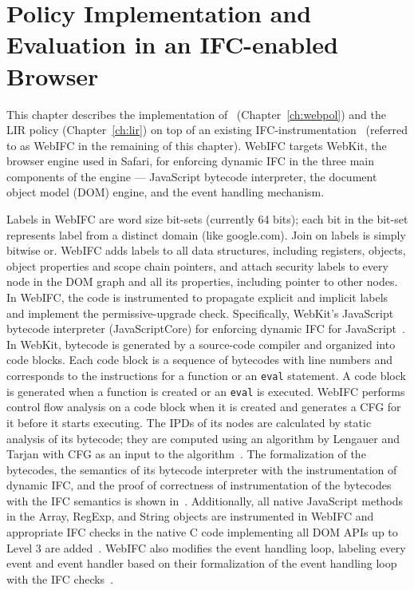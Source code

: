 \chapter{Policy Implementation and Evaluation in an IFC-enabled Browser}
\label{ch:eval}

This chapter describes the implementation of \sys~(Chapter~\ref{ch:webpol}) 
and the LIR policy (Chapter~\ref{ch:lir}) on top of
an existing IFC-instrumentation~\cite{just11PLASTIC,post14,csf15} 
(referred to as WebIFC in the remaining of this chapter). 
WebIFC targets WebKit, the browser engine used 
in Safari, for enforcing 
dynamic IFC in the three main components of the engine --- JavaScript 
bytecode interpreter, the document object model (DOM) engine, and the
event handling mechanism. 

Labels in WebIFC are word size bit-sets (currently 64 
bits); each bit in the bit-set represents label from a distinct domain
(like google.com). Join on labels is simply bitwise or. 
WebIFC adds labels to all data structures, including
registers, objects, object properties and scope chain pointers, and  
attach security labels to every node in the DOM graph and all its 
properties, including pointer to other nodes. 
In WebIFC, the code is instrumented to propagate explicit and 
implicit labels and implement the permissive-upgrade check. 
Specifically, WebKit’s JavaScript bytecode interpreter 
(JavaScriptCore) for enforcing dynamic IFC for 
JavaScript~\cite{just11PLASTIC,post14}. In WebKit, bytecode is generated
by a source-code compiler and organized into code blocks. Each code
block is a sequence of bytecodes with line numbers and corresponds to
the instructions for a function or an \texttt{eval} statement. A code
block is generated when a function is created or an \texttt{eval} is
executed. WebIFC performs control flow analysis on a
code block when it is created and generates a CFG for it before it
starts executing. The IPDs of its nodes are calculated by static
analysis of its bytecode; they are computed using an algorithm by
Lengauer and Tarjan with CFG as an input to the
algorithm~\cite{Lengauer}. The formalization of the bytecodes, the
semantics of its bytecode interpreter with the instrumentation of
dynamic IFC, and the proof of correctness of instrumentation of the
bytecodes with the IFC semantics is shown in~\cite{post14Extended}.
Additionally, all native JavaScript methods in the Array, RegExp, 
and String objects are instrumented in WebIFC and appropriate  
IFC checks in the native C code implementing all DOM APIs up
to Level 3 are added~\cite{csf15}. 
WebIFC also modifies the event handling loop, labeling every event and
event handler based on their formalization of the event handling loop
with the IFC checks~\cite{csf15}.  

